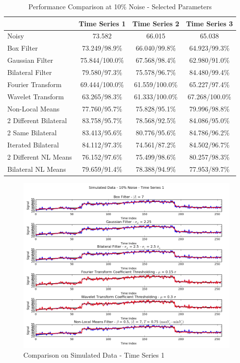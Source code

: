 \documentclass[11pt]{article}
\theoremstyle{definition}
\begin{document}
\begin{table}
\small
\begin{center}
\begin{tabular}{l | c | c | c}
 & Time Series 1 & Time Series 2 & Time Series 3 \\ \hline
Noisy & 73.582 & 66.015 & 65.038 \\ \hline
Box Filter &73.249/98.9\% &66.040/99.8\% & 64.923/99.3\% \\ \hline
Gaussian Filter & 75.844/100.0\% & 67.568/98.4\% & 62.980/91.0\% \\ \hline
Bilateral Filter & 79.580/97.3\% & 75.578/96.7\% & 84.480/99.4\% \\ \hline
Fourier Transform & 69.444/100.0\% & 61.559/100.0\% & 65.227/97.4\% \\ \hline
Wavelet Transform & 63.265/98.3\% & 61.333/100.0\% & 67.268/100.0\% \\ \hline
Non-Local Means & 77.760/95.7\% & 75.828/95.1\% & 79.996/98.8\% \\ \hline
2 Different Bilateral & 83.758/95.7\% & 78.568/92.5\% & 84.086/95.0\% \\ \hline
2 Same Bilateral & 83.413/95.6\% & 80.776/95.6\% & 84.786/96.2\% \\ \hline
Iterated Bilateral & 84.112/97.3\% & 74.561/87.2\% & 84.502/96.7\% \\ \hline
2 Different NL Means & 76.152/97.6\% & 75.499/98.6\% & 80.257/98.3\% \\ \hline
Bilateral NL Means & 79.659/91.4\% & 78.388/94.9\% & 77.953/89.7\%
\end{tabular}
\caption{Performance Comparison at 10\% Noise - Selected Parameters}
\label{comparisonselected}
\end{center}
\end{table}

\begin{figure}[h!]
\centering
\includegraphics[width = 0.95 \textwidth]{TimeSeries1SimulatedCompare.png}
\caption{Comparison on Simulated Data - Time Series 1}
\label{timeseries1simulatedcompare}
\end{figure}
\end{document}
